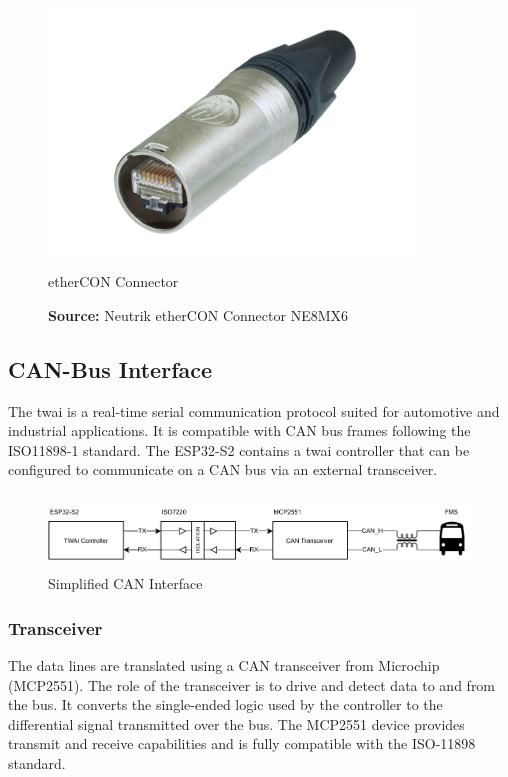 \begin{figure}[h!]
	\centering
	\includegraphics[height=6.5cm]{images/ethercon.jpg}
	\caption{etherCON Connector}
	\vspace{-1.4ex}
	\caption*{\textbf{Source:} Neutrik etherCON Connector NE8MX6 \cite{neutrik-ethercon}}
	\label{fig:neutrik-ethercon}
\end{figure}


\subsection{CAN-Bus Interface}
The \acrfull{twai} is a real-time serial communication protocol suited for automotive and industrial applications. It is compatible with CAN bus frames following the ISO11898-1 standard. The ESP32-S2 contains a \acrshort{twai} controller that can be configured to communicate on a CAN bus via an external transceiver.

\begin{figure}[h!]
	\centering
	\includegraphics[height=2.0cm]{images/can-interface}
	\caption{Simplified CAN Interface}
	\label{fig:can-interface}
\end{figure}

\subsubsection{Transceiver}
The data lines are translated using a CAN transceiver from Microchip (MCP2551). The role of the transceiver is to drive and detect data to and from the bus. It converts the single-ended logic used by the controller to the differential signal transmitted over the bus. The MCP2551 device provides transmit and receive capabilities and is fully compatible with the ISO-11898 standard.
\newpage

